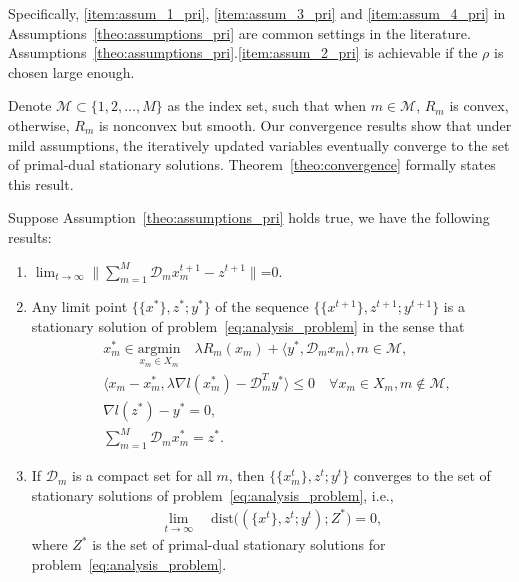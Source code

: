 Specifically, \ref{item:assum_1_pri}, \ref{item:assum_3_pri} and \ref{item:assum_4_pri} in Assumptions~\ref{theo:assumptions_pri} are common settings in the literature. Assumptions~\ref{theo:assumptions_pri}.\ref{item:assum_2_pri} is achievable if the $\rho$ is chosen large enough.

Denote $\mathcal{M}\subset\{1,2,\ldots, M\}$ as the index set, such that when $ m\in\mathcal{M}$, $R_m$ is convex, otherwise, $R_m$ is nonconvex but smooth. Our convergence results show that under mild assumptions, the iteratively updated variables eventually converge to the set of primal-dual stationary solutions. Theorem~\ref{theo:convergence} formally states this result.
\begin{theorem}\label{theo:convergence}
Suppose Assumption~\ref{theo:assumptions_pri} holds true, we have the following results:
\begin{enumerate}
    \item $\lim_{t\rightarrow\infty}\|\sum_{m=1}^{M} \mathcal{D}_mx_m^{t+1} - z^{t+1}\|$=0.\label{item:primal_cond_limit}
    \item Any limit point $\{\{x^*\}, z^*; y^*\}$ of the sequence $\{\{x^{t+1}\}, z^{t+1}; y^{t+1}\}$ is a stationary solution of problem~\eqref{eq:analysis_problem} in the sense that
    \begin{align}
        & x_m^* \in \underset{x_m\in X_m}{\text{argmin}}\quad \lambda R_m(x_m) + \langle y^*, \mathcal{D}_mx_m\rangle, m\in\mathcal{M},\label{eq:cond_x_opt_conv}\\
        & \langle x_m - x_m^*, \lambda\nabla l(x_m^*) - \mathcal{D}_m^T y^* \rangle\le 0\quad\forall x_m\in X_m, m\not\in\mathcal{M}, \label{eq:cond_x_opt_nonconv}\\
        & \nabla l(z^*) - y^* = 0,\label{eq:cond_dual}\\
        & \sum_{m=1}^{M}\mathcal{D}_mx_m^* = z^*.\label{eq:cond_primal}
    \end{align}
    \item If $\mathcal{D}_m$ is a compact set for all $m$, then $\{\{x_m^t\}, z^t; y^t\}$ converges to the set of stationary solutions of problem~\eqref{eq:analysis_problem}, i.e.,
    \begin{align}
        \underset{t\rightarrow\infty}{\lim}\quad\text{dist}\big((\{x^t\}, z^t; y^t);Z^*\big) = 0,\nonumber
    \end{align}
    where $Z^*$ is the set of primal-dual stationary solutions for problem~\eqref{eq:analysis_problem}.
\end{enumerate}
\end{theorem}

